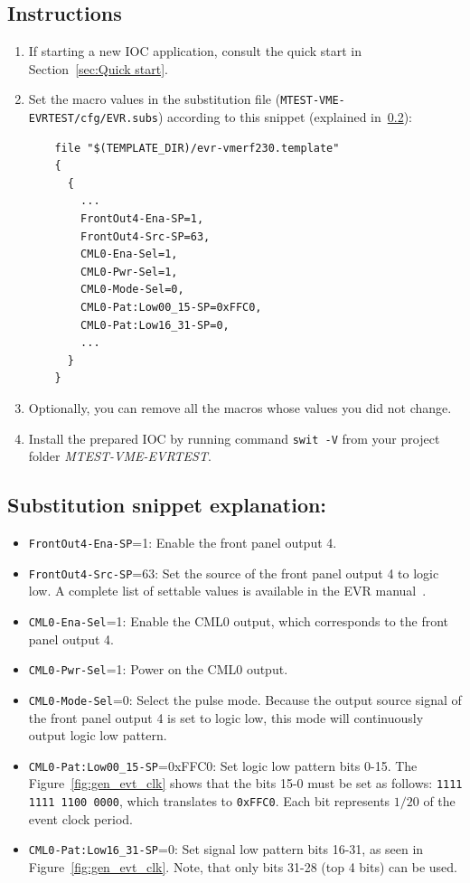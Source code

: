 \documentclass[12pt,a4paper]{article}
\begin{document}
\subsection{Instructions}
\begin{enumerate}
	\item If starting a new IOC application, consult the quick start in Section~\ref{sec:Quick start}.
	
	\item Set the macro values in the substitution file (\texttt{MTEST-VME-EVRTEST/cfg/EVR.subs}) according to this snippet (explained in~\ref{sec:explain_cml}):
\begin{verbatim}
	file "$(TEMPLATE_DIR)/evr-vmerf230.template"
	{
	  {
	    ...
	    FrontOut4-Ena-SP=1,
	    FrontOut4-Src-SP=63,
	    CML0-Ena-Sel=1,
	    CML0-Pwr-Sel=1,
	    CML0-Mode-Sel=0,
	    CML0-Pat:Low00_15-SP=0xFFC0,
	    CML0-Pat:Low16_31-SP=0, 
	    ...
	  }
	}
\end{verbatim}

	\item Optionally, you can remove all the macros whose values you did not change. 
	\item Install the prepared IOC by running command \texttt{swit -V} from your project folder \textit{MTEST-VME-EVRTEST}.
\end{enumerate}

\subsection{Substitution snippet explanation:}\label{sec:explain_cml}
\begin{itemize}
	\item \texttt{FrontOut4-Ena-SP}=1: Enable the front panel output 4.
	\item \texttt{FrontOut4-Src-SP}=63: Set the source of the front panel output 4 to logic low. A complete list of settable values is available in the EVR manual~\cite{evr_manual}.
	\item \texttt{CML0-Ena-Sel}=1: Enable the CML0 output, which corresponds to the front panel output 4.
	\item \texttt{CML0-Pwr-Sel}=1: Power on the CML0 output.
	\item \texttt{CML0-Mode-Sel}=0: Select the pulse mode. Because the output source signal of the front panel output 4 is set to logic low, this mode will continuously output logic low pattern.
	\item \texttt{CML0-Pat:Low00\_15-SP}=0xFFC0: Set logic low pattern bits 0-15. The Figure~\ref{fig:gen_evt_clk} shows that the bits 15-0 must be set as follows: \texttt{1111 1111 1100 0000}, which translates to \texttt{0xFFC0}. Each bit represents $1/20$ of the event clock period.
	\item \texttt{CML0-Pat:Low16\_31-SP}=0: Set signal low pattern bits 16-31, as seen in Figure~\ref{fig:gen_evt_clk}. Note, that only bits 31-28 (top 4 bits) can be used.
\end{itemize}
\end{document}
